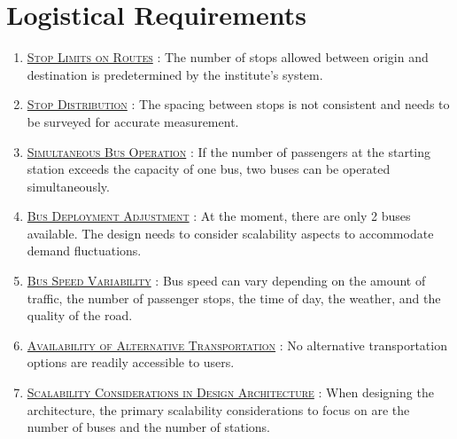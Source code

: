 \section{Logistical Requirements}

\begin{enumerate}

\item \underline{\textsc{Stop Limits on Routes}} : The number of stops allowed between origin and destination is predetermined by the institute's system.

\item \underline{\textsc{Stop Distribution}} : The spacing between stops is not consistent and needs to be surveyed for accurate measurement.

\item \underline{\textsc{Simultaneous Bus Operation}} : If the number of passengers at the starting station exceeds the capacity of one bus, two buses can be operated simultaneously.

\item \underline{\textsc{Bus Deployment Adjustment}} : At the moment, there are only 2 buses available. The design needs to consider scalability aspects to accommodate demand fluctuations.

\item \underline{\textsc{Bus Speed Variability}} : Bus speed can vary depending on the amount of traffic, the number of passenger stops, the time of day, the weather, and the quality of the road.

\item \underline{\textsc{Availability of Alternative Transportation}} : No alternative transportation options are readily accessible to users.

\item \underline{\textsc{Scalability Considerations in Design Architecture}} : When designing the architecture, the primary scalability considerations to focus on are the number of buses and the number of stations.
\end{enumerate}